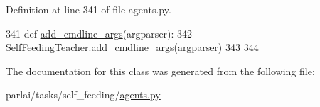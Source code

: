 Definition at line 341 of file agents.\+py.


\begin{DoxyCode}
341     \textcolor{keyword}{def }\hyperlink{namespaceparlai_1_1agents_1_1drqa_1_1config_a62fdd5554f1da6be0cba185271058320}{add\_cmdline\_args}(argparser):
342         SelfFeedingTeacher.add\_cmdline\_args(argparser)
343 
344 
\end{DoxyCode}


The documentation for this class was generated from the following file\+:\begin{DoxyCompactItemize}
\item 
parlai/tasks/self\+\_\+feeding/\hyperlink{parlai_2tasks_2self__feeding_2agents_8py}{agents.\+py}\end{DoxyCompactItemize}
